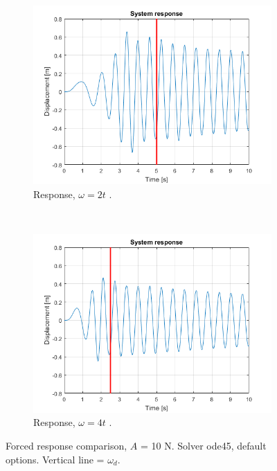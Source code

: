 \documentclass{article}
\begin{document}
	\begin{figure}[h!]
		\centering
		\begin{subfigure}[t]{0.41\textwidth}
			\includegraphics[width=\textwidth]{forced_response_slow.png}
			\caption{Response, $\omega = 2 t$ .}
		\end{subfigure}
		~
		\begin{subfigure}[t]{0.41\textwidth}
			\includegraphics[width=\textwidth]{forced_response_fast.png}
			\caption{Response, $\omega = 4 t$ .}
		\end{subfigure}
		\caption{Forced response comparison, $A$ = 10 N. Solver ode45, default options. Vertical line = $\omega_d$.}
		\label{fig:forced_response}
	\end{figure}
\end{document}
